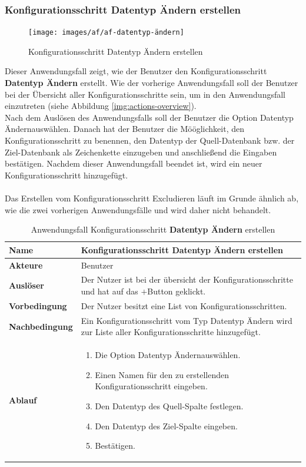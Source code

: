 \subsubsection{Konfigurationsschritt \textbf{Datentyp Ändern} erstellen}
\begin{figure}[H]
	\caption{Konfigurationsschritt \glqq Datentyp Ändern \grqq erstellen}
	\centering
	\texttt{[image: images/af/af-datentyp-ändern]}
	\label{img:af-datentyp-ändern}
\end{figure}
Dieser Anwendungsfall zeigt, wie der Benutzer den Konfigurationsschritt \textbf{Datentyp Ändern} erstellt. Wie der vorherige Anwendungsfall soll der Benutzer bei der Übersicht aller Konfigurationsschritte sein, um in den Anwendungsfall einzutreten (siehe Abbildung \ref{img:actions-overview}).\\
Nach dem Auslösen des Anwendungsfalls soll der Benutzer die Option \glqq Datentyp Ändern\grqq auswählen. Danach hat der Benutzer die Mööglichkeit, den Konfigurationsschritt zu benennen, den Datentyp der Quell-Datenbank bzw. der Ziel-Datenbank als Zeichenkette einzugeben und anschließend die Eingaben bestätigen. Nachdem dieser Anwendungsfall beendet ist, wird ein neuer Konfigurationsschritt hinzugefügt.\\ \\
Das Erstellen vom Konfigurationsschritt \glqq Excludieren \grqq läuft im Grunde ähnlich ab, wie die zwei vorherigen Anwendungsfälle und wird daher nicht behandelt.
\begin{table}[H]
	\centering
	\begin{tabular}{ |p{4cm}|p{8cm}| }
		\hline
		\textbf{Name} &  Konfigurationsschritt Datentyp Ändern erstellen \\
		\hline
		\textbf{Akteure} & Benutzer  \\
		\hline
		\textbf{Auslöser} & Der Nutzer ist bei der übersicht der Konfigurationsschritte und hat auf das \glqq $+$\grqq Button geklickt.  \\
		\hline
		\textbf{Vorbedingung} & Der Nutzer besitzt eine List von Konfigurationsschritten.  \\
		\hline
		\textbf{Nachbedingung} & Ein Konfigurationsschritt vom Typ Datentyp Ändern wird zur Liste aller Konfigurationsschritte hinzugefügt.  \\
		\hline
		\textbf{Ablauf} & 
		\begin{enumerate}
			\item Die Option \glqq Datentyp Ändern\grqq auswählen.
			\item Einen Namen für den zu erstellenden Konfigurationsschritt eingeben.
			\item Den Datentyp des Quell-Spalte festlegen.
			\item Den Datentyp des Ziel-Spalte eingeben.
			\item Bestätigen.
		\end{enumerate}   \\
		\hline
		
	\end{tabular}
	\caption{Anwendungsfall Konfigurationsschritt \textbf{Datentyp Ändern} erstellen}
	\label{table:datentyp-ändern}
\end{table}




